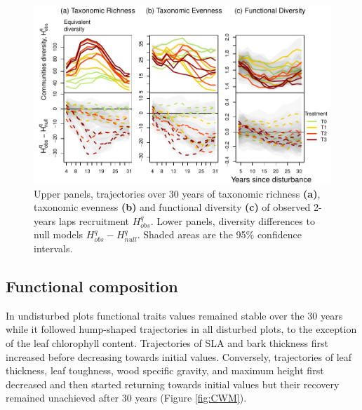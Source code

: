 \documentclass[fleqn,10pt]{ArtEcoFoG} %
\begin{document}
\begin{figure}

{\centering \includegraphics{RecruitmentTrajectories_files/figure-latex/DivTraj-1} 

}

\caption{Upper panels, trajectories over 30 years of taxonomic richness \textbf{(a)}, taxonomic evenness \textbf{(b)} and functional diversity \textbf{(c)} of observed 2-years laps recruitment $H_{obs}^q$. Lower panels, diversity differences to null models $H_{obs}^q - H_{null}^q$. Shaded areas are the 95\% confidence intervals.}\label{fig:DivTraj}
\end{figure}

\hypertarget{functional-composition}{%
\subsection{Functional composition}\label{functional-composition}}

In undisturbed plots functional traits values remained stable over the 30 years while it followed hump-shaped trajectories in all disturbed plots, to the exception of the leaf chlorophyll content.
Trajectories of SLA and bark thickness first increased before decreasing towards initial values.
Conversely, trajectories of leaf thickness, leaf toughness, wood specific gravity, and maximum height first decreased and then started returning towards initial values but their recovery remained unachieved after 30 years (Figure \ref{fig:CWM}).
\end{document}
